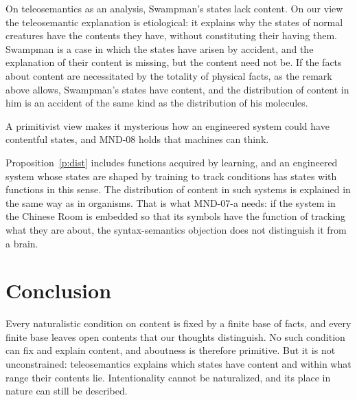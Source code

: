 \documentclass{situationist-preprint}
\begin{document}
\begin{reply}
On teleosemantics as an analysis, Swampman's states lack content. On our view the teleosemantic explanation is etiological: it explains why the states of normal creatures have the contents they have, without constituting their having them. Swampman is a case in which the states have arisen by accident, and the explanation of their content is missing, but the content need not be. If the facts about content are necessitated by the totality of physical facts, as the remark above allows, Swampman's states have content, and the distribution of content in him is an accident of the same kind as the distribution of his molecules.
\end{reply}

\begin{objection}[Machines]
A primitivist view makes it mysterious how an engineered system could have contentful states, and MND-08 holds that machines can think.
\end{objection}

\begin{reply}
Proposition~\ref{p:dist} includes functions acquired by learning, and an engineered system whose states are shaped by training to track conditions has states with functions in this sense. The distribution of content in such systems is explained in the same way as in organisms. That is what MND-07-a needs: if the system in the Chinese Room is embedded so that its symbols have the function of tracking what they are about, the syntax-semantics objection does not distinguish it from a brain.
\end{reply}

\section{Conclusion}

Every naturalistic condition on content is fixed by a finite base of facts, and every finite base leaves open contents that our thoughts distinguish. No such condition can fix and explain content, and aboutness is therefore primitive. But it is not unconstrained: teleosemantics explains which states have content and within what range their contents lie. Intentionality cannot be naturalized, and its place in nature can still be described.
\end{document}
